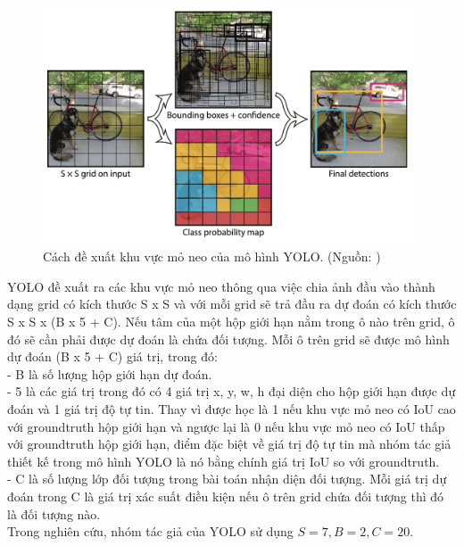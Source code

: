 {    \begin{figure}[H]
        \centering
        \includegraphics[width=11cm] {images/yolo_anchor}
        \caption{Cách đề xuất khu vực mỏ neo của mô hình YOLO. (Nguồn: \cite{redmon2016look})}
        \label{fig:yolo_anchor}
    \end{figure}

    \noindent
    YOLO đề xuất ra các khu vực mỏ neo thông qua việc chia ảnh đầu vào thành dạng grid có kích thước S x S và với mỗi grid sẽ trả đầu ra dự đoán có kích thước S x S x (B x 5 + C).
    Nếu tâm của một hộp giới hạn nằm trong ô nào trên grid, ô đó sẽ cần phải được dự đoán là chứa đối tượng.
    Mỗi ô trên grid sẽ được mô hình dự đoán (B x 5 + C) giá trị, trong đó: \\
    - B là số lượng hộp giới hạn dự đoán. \\
    - 5 là các giá trị trong đó có 4 giá trị x, y, w, h đại diện cho hộp giới hạn được dự đoán và 1 giá trị độ tự tin.
    Thay vì được học là 1 nếu khu vực mỏ neo có IoU cao với groundtruth hộp giới hạn và ngược lại là 0 nếu khu vực mỏ neo có IoU thấp với groundtruth hộp giới hạn, điểm đặc biệt về giá trị độ tự tin mà nhóm tác giả thiết kế trong mô hình YOLO là nó bằng chính giá trị IoU so với groundtruth. \\
    - C là số lượng lớp đối tượng trong bài toán nhận diện đối tượng.
    Mỗi giá trị dự đoán trong C là giá trị xác suất điều kiện nếu ô trên grid chứa đối tượng thì đó là đối tượng nào. \\
    Trong nghiên cứu, nhóm tác giả của YOLO sử dụng $S = 7, B = 2, C = 20$.

}

